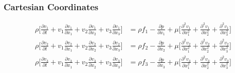 \documentclass[11pt, letterpaper, notitlepage]{article}
\begin{document}
\subsubsection{Cartesian Coordinates}
\begin{align*}
\rho \biggl[ \frac{\partial v_1}{\partial t} + v_1 \frac{\partial v_1}{\partial x_1} + v_2 \frac{\partial v_1}{\partial x_2} + v_3 \frac{\partial v_1}{\partial x_3} \biggr] &= \rho f_1 - \frac{\partial p}{\partial x_1} + \mu \biggl[ \frac{\partial^2 v_1}{\partial x^2_1} + \frac{\partial^2 v_1}{\partial x^2_2} + \frac{\partial^2 v_1}{\partial x^2_3} \biggr] \\
\rho \biggl[ \frac{\partial v_2}{\partial t} + v_1 \frac{\partial v_2}{\partial x_1} + v_2 \frac{\partial v_2}{\partial x_2} + v_3 \frac{\partial v_2}{\partial x_3} \biggr] &= \rho f_2 - \frac{\partial p}{\partial x_2} + \mu \biggl[ \frac{\partial^2 v_2}{\partial x^2_1} + \frac{\partial^2 v_2}{\partial x^2_2} + \frac{\partial^2 v_2}{\partial x^2_3} \biggr] \\
\rho \biggl[ \frac{\partial v_3}{\partial t} + v_1 \frac{\partial v_3}{\partial x_1} + v_2 \frac{\partial v_3}{\partial x_2} + v_3 \frac{\partial v_3}{\partial x_3} \biggr] &= \rho f_3 - \frac{\partial p}{\partial x_3} + \mu \biggl[ \frac{\partial^2 v_3}{\partial x^2_1} + \frac{\partial^2 v_3}{\partial x^2_2} + \frac{\partial^2 v_3}{\partial x^2_3} \biggr] \\
\end{align*}
\end{document}
